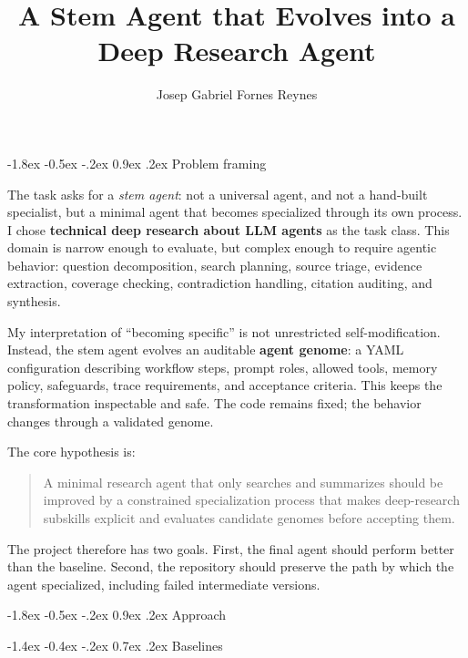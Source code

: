 \documentclass[10pt]{article}
\title{\vspace{-1.2em}\textbf{A Stem Agent that Evolves into a Deep Research Agent}}
\author{Josep Gabriel Fornes Reynes}
\date{}
\makeatletter
\renewcommand\section{\@startsection{section}{1}{\z@}%
  {-1.8ex \@plus -0.5ex \@minus -.2ex}%
  {0.9ex \@plus .2ex}%
  {\normalfont\large\bfseries}}
\renewcommand\subsection{\@startsection{subsection}{2}{\z@}%
  {-1.4ex \@plus -0.4ex \@minus -.2ex}%
  {0.7ex \@plus .2ex}%
  {\normalfont\normalsize\bfseries}}
\makeatother
\begin{document}
\maketitle
\vspace{-1.8em}

\section{Problem framing}

The task asks for a \emph{stem agent}: not a universal agent, and not a hand-built specialist, but a minimal agent that becomes specialized through its own process. I chose \textbf{technical deep research about LLM agents} as the task class. This domain is narrow enough to evaluate, but complex enough to require agentic behavior: question decomposition, search planning, source triage, evidence extraction, coverage checking, contradiction handling, citation auditing, and synthesis.

My interpretation of ``becoming specific'' is not unrestricted self-modification. Instead, the stem agent evolves an auditable \textbf{agent genome}: a YAML configuration describing workflow steps, prompt roles, allowed tools, memory policy, safeguards, trace requirements, and acceptance criteria. This keeps the transformation inspectable and safe. The code remains fixed; the behavior changes through a validated genome.

The core hypothesis is:

\begin{quote}
A minimal research agent that only searches and summarizes should be improved by a constrained specialization process that makes deep-research subskills explicit and evaluates candidate genomes before accepting them.
\end{quote}

The project therefore has two goals. First, the final agent should perform better than the baseline. Second, the repository should preserve the path by which the agent specialized, including failed intermediate versions.

\section{Approach}

\subsection{Baselines}
\end{document}
